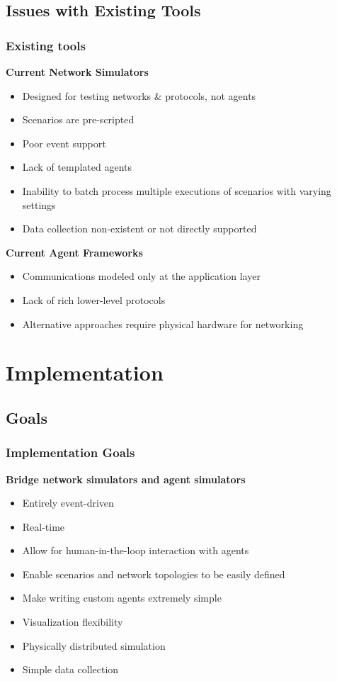 \documentclass[mathserif]{beamer}
\begin{document}
\subsection{Issues with Existing Tools}
\frame
{
    \frametitle{Existing tools}
    \textbf{Current Network Simulators}
    \begin{itemize}
        \item Designed for testing networks \& protocols, not agents 
        \item Scenarios are pre-scripted
        \item Poor event support
        \item Lack of templated agents
        \item Inability to batch process multiple executions of scenarios with varying settings
        \item Data collection non-existent or not directly supported
    \end{itemize}
    \textbf{Current Agent Frameworks}
    \begin{itemize}
        \item Communications modeled only at the application layer
        \item Lack of rich lower-level protocols
        \item Alternative approaches require physical hardware for networking
    \end{itemize}
}

\section{Implementation}

\subsection{Goals}
\frame
{
    \frametitle{Implementation Goals}
    \textbf{Bridge network simulators and agent simulators}
    \begin{itemize}
        \item Entirely event-driven
        \item Real-time
        \item Allow for human-in-the-loop interaction with agents
        \item Enable scenarios and network topologies to be easily defined
        \item Make writing custom agents extremely simple
        \item Visualization flexibility
        \item Physically distributed simulation
        \item Simple data collection
    \end{itemize}
}
\end{document}
